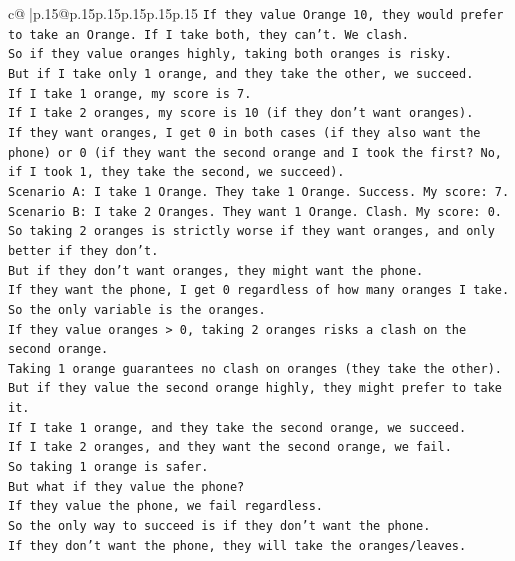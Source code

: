 \documentclass{article}
\begin{document}
{\begin{supertabular}{c@{$\;$}|p{.15\linewidth}@{}p{.15\linewidth}p{.15\linewidth}p{.15\linewidth}p{.15\linewidth}p{.15\linewidth}}
{{{\texttt{If they value Orange 10, they would prefer to take an Orange. If I take both, they can't. We clash.} \\
\texttt{So if they value oranges highly, taking both oranges is risky.} \\
\texttt{But if I take only 1 orange, and they take the other, we succeed.} \\
\texttt{If I take 1 orange, my score is 7.} \\
\texttt{If I take 2 oranges, my score is 10 (if they don't want oranges).} \\
\texttt{If they want oranges, I get 0 in both cases (if they also want the phone) or 0 (if they want the second orange and I took the first? No, if I took 1, they take the second, we succeed).} \\
\texttt{Scenario A: I take 1 Orange. They take 1 Orange. Success. My score: 7.} \\
\texttt{Scenario B: I take 2 Oranges. They want 1 Orange. Clash. My score: 0.} \\
\texttt{So taking 2 oranges is strictly worse if they want oranges, and only better if they don't.} \\
\texttt{But if they don't want oranges, they might want the phone.} \\
\texttt{If they want the phone, I get 0 regardless of how many oranges I take.} \\
\texttt{So the only variable is the oranges.} \\
\texttt{If they value oranges > 0, taking 2 oranges risks a clash on the second orange.} \\
\texttt{Taking 1 orange guarantees no clash on oranges (they take the other).} \\
\texttt{But if they value the second orange highly, they might prefer to take it.} \\
\texttt{If I take 1 orange, and they take the second orange, we succeed.} \\
\texttt{If I take 2 oranges, and they want the second orange, we fail.} \\
\texttt{So taking 1 orange is safer.} \\
\texttt{But what if they value the phone?} \\
\texttt{If they value the phone, we fail regardless.} \\
\texttt{So the only way to succeed is if they don't want the phone.} \\
\texttt{If they don't want the phone, they will take the oranges/leaves.} \\
}}}
\end{supertabular}}
\end{document}

